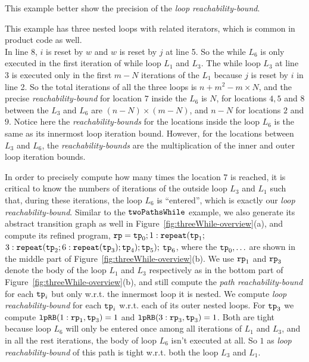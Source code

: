 \begin{example}
  \label{ex:threeNestedWhile}
  This example better show the precision of the \emph{loop reachability-bound}.

This example has three nested loops with related iterators, which is common in product code as well.
\\
In line 8, $i$ is reset by $w$ and $w$ is reset by $j$ at line 5. So the
while $L_6$ is only executed in the first iteration of while loop $L_1$ and $L_3$.
The while loop $L_3$ at line 3 is executed only in 
the first $m - N$ iterations of the 
$L_1$ because $j$ is reset by $i$ in line 2.
So the total iterations of all the three loops is
$n + m^2 - m \times N$,
and the precise \emph{reachability-bound} for location $7$ inside the $L_6$ is $N$,
for locations $4, 5$ and $8$ between the $L_3$ and $L_6$ are $(n-N) \times (m - N)$,
and $n - N$ for locations $2$ and $9$.
Notice here the \emph{reachability-bounds} for the locations inside the loop $L_6$ is 
the same as its innermost loop iteration bound.
However, for the locations between $L_3$ and $L_6$,
the \emph{reachability-bounds} are the multiplication of the inner and outer loop iteration bounds.

In order to precisely compute how many times the location $7$ is reached, it is critical to know
the numbers of iterations of the outside loop $L_3$ and $L_1$ such that,
during these iterations, the loop $L_6$ is ``entered'', which is exactly our \emph{loop reachability-bound}.
Similar to the $\mathtt{twoPathsWhile}$ example, we also generate its abstract transition graph as well in Figure~\ref{fig:threeWhile-overview}(a),
and compute its refined program,
$\mathtt{rp} = \mathtt{tp}_0; 1: \mathtt{repeat}(\mathtt{tp}_1;$ 
$3: {\mathtt{repeat}(\mathtt{tp}_2; 6 : {\mathtt{repeat}(\mathtt{tp}_3)}; \mathtt{tp}_4)}; \mathtt{tp}_5);$ 
$\mathtt{tp}_6$,
where the $\mathtt{tp}_0, \ldots$ are shown in the middle part of Figure~\ref{fig:threeWhile-overview}(b).
We use $\mathtt{rp}_1$ and $\mathtt{rp}_3$ denote the body of the loop $L_1$ and $L_3$ respectively as in the bottom part of Figure~\ref{fig:threeWhile-overview}(b), and still compute the \emph{path reachability-bound} for each $\mathtt{tp}_i$ but only w.r.t. the innermost loop it is nested.
We compute \emph{loop reachability-bound} for each $\mathtt{tp}_i$ w.r.t. each of its outer nested loops.
For $\mathtt{tp}_3$ we compute
$\mathtt{lpRB}(1: \mathtt{rp}_1, \mathtt{tp}_3) = 1$ and
$\mathtt{lpRB}(3: \mathtt{rp}_3, \mathtt{tp}_3) = 1$.
Both are tight because loop $L_6$ will only be entered once among all iterations of $L_1$ and $L_3$, and in all the rest iterations, the body of loop $L_6$ isn't executed at all.
So $1$ as \emph{loop reachability-bound} of this path is tight w.r.t. both the loop $L_3$ and $L_1$.

\end{example}
